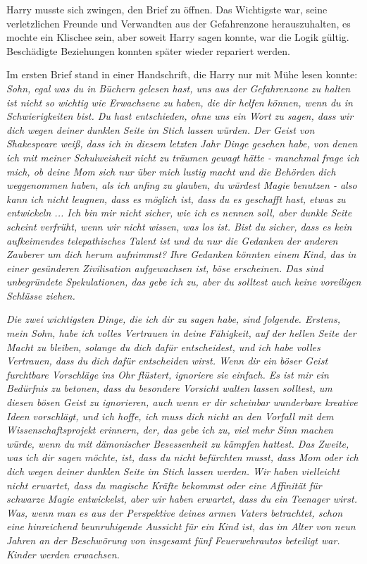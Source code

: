 Harry musste sich zwingen, den Brief zu öffnen. Das Wichtigste war, seine
verletzlichen Freunde und Verwandten aus der Gefahrenzone herauszuhalten, es
mochte ein Klischee sein, aber soweit Harry sagen konnte, war die Logik gültig.
Beschädigte Beziehungen konnten später wieder repariert werden.

Im ersten Brief stand in einer Handschrift, die Harry nur mit Mühe lesen konnte:
\emph{Sohn, egal was du in Büchern gelesen hast, uns aus der Gefahrenzone zu
halten ist nicht so wichtig wie Erwachsene zu haben, die dir helfen können, wenn
du in Schwierigkeiten bist. Du hast entschieden, ohne uns ein Wort zu sagen,
dass wir dich wegen deiner \glqq{}dunklen Seite\grqq{} im Stich lassen würden.
Der Geist von Shakespeare weiß, dass ich in diesem letzten Jahr Dinge gesehen
habe, von denen ich mit meiner Schulweisheit nicht zu träumen gewagt hätte -
manchmal frage ich mich, ob deine Mom sich nur über mich lustig macht und die
Behörden dich weggenommen haben, als ich anfing zu glauben, du würdest Magie
benutzen - also kann ich nicht leugnen, dass es möglich ist, dass du es
geschafft hast, etwas zu entwickeln ... Ich bin mir nicht sicher, wie ich es
nennen soll, aber \glqq{}dunkle Seite\grqq{} scheint verfrüht, wenn wir nicht
wissen, was los ist. Bist du sicher, dass es kein aufkeimendes telepathisches
Talent ist und du nur die Gedanken der anderen Zauberer um dich herum aufnimmst?
Ihre Gedanken könnten einem Kind, das in einer gesünderen Zivilisation
aufgewachsen ist, böse erscheinen. Das sind unbegründete Spekulationen, das gebe
ich zu, aber du solltest auch keine voreiligen Schlüsse ziehen.}

\emph{Die zwei wichtigsten Dinge, die ich dir zu sagen habe, sind folgende.
Erstens, mein Sohn, habe ich volles Vertrauen in deine Fähigkeit, auf der hellen
Seite der Macht zu bleiben, solange du dich dafür entscheidest, und ich habe
volles Vertrauen, dass du dich dafür entscheiden wirst. Wenn dir ein böser Geist
furchtbare Vorschläge ins Ohr flüstert, ignoriere sie einfach. Es ist mir ein
Bedürfnis zu betonen, dass du besondere Vorsicht walten lassen solltest, um
diesen bösen Geist zu ignorieren, auch wenn er dir scheinbar wunderbare kreative
Ideen vorschlägt, und ich hoffe, ich muss dich nicht an den Vorfall mit dem
Wissenschaftsprojekt erinnern, der, das gebe ich zu, viel mehr Sinn machen
würde, wenn du mit dämonischer Besessenheit zu kämpfen hattest. Das Zweite, was
ich dir sagen möchte, ist, dass du nicht befürchten musst, dass Mom oder ich
dich wegen deiner \glqq{}dunklen Seite\grqq{} im Stich lassen werden. Wir haben
vielleicht nicht erwartet, dass du magische Kräfte bekommst oder eine Affinität
für schwarze Magie entwickelst, aber wir haben erwartet, dass du ein Teenager
wirst. Was, wenn man es aus der Perspektive deines armen Vaters betrachtet,
schon eine hinreichend beunruhigende Aussicht für ein Kind ist, das im Alter von
neun Jahren an der Beschwörung von insgesamt fünf Feuerwehrautos beteiligt war.
}
\emph{Kinder werden erwachsen.}

